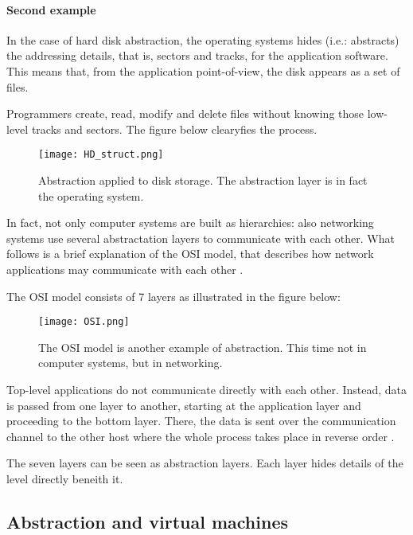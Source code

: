 \paragraph{Second example}

In the case of hard disk abstraction, the operating systems hides (i.e.: abstracts) the addressing details, that is, sectors and tracks, for the application software. This means that, from the application point-of-view, the disk appears as a set of files.

Programmers create, read, modify and delete files without knowing those low-level tracks and sectors. The figure below clearyfies the process.

\begin{figure}[h]
    \centering
    \texttt{[image: HD\_struct.png]}
    \caption[Abstraction applied to disk storage]{Abstraction applied to disk storage. The abstraction layer is in fact the operating system.}
\end{figure}

\clearpage

In fact, not only computer systems are built as hierarchies: also networking systems use several abstractation layers to communicate with each other. What follows is a brief explanation of the OSI model, that describes how network applications may communicate with each other \citep{OSI}.

The OSI model consists of 7 layers as illustrated in the figure below:
\begin{figure}[h]
    \centering
    \texttt{[image: OSI.png]}
    \caption[The OSI model]{The OSI model is another example of abstraction. This time not in computer systems, but in networking.}
\end{figure}
Top-level applications do not communicate directly with each other. Instead, data is passed from one layer to another, starting at the application layer and proceeding to the bottom layer. There, the data is sent over the communication channel to the other host where the whole process takes place in reverse order \citep{OSI2}. 

The seven layers can be seen as abstraction layers. Each layer hides details of the level directly beneith it.

\subsection{Abstraction and virtual machines}

